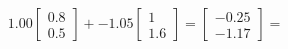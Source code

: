 \documentclass[preview]{standalone}
\begin{document}
\begin{align*}
1.00 \begin{bmatrix} 0.8 \\ 0.5 \end{bmatrix} + -1.05 \begin{bmatrix} 1 \\ 1.6 \end{bmatrix} = \begin{bmatrix} -0.25 \\ -1.17 \end{bmatrix} =
\end{align*}
\end{document}

